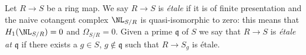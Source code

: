 \begin{definition}
\label{definition-etale}
Let $R \to S$ be a ring map. We say $R \to S$ is {\it \'etale} if it is
of finite presentation and the naive cotangent complex
$\NL_{S/R}$ is quasi-isomorphic to zero: this means that $H_1(\NL_{S/R}) = 0$
and $\Omega_{S/R} = 0$. Given a prime $\mathfrak q$
of $S$ we say that $R \to S$ is {\it \'etale at $\mathfrak q$}
if there exists a $g \in S$, $g \not \in \mathfrak q$ such that
$R \to S_g$ is \'etale.
\end{definition}